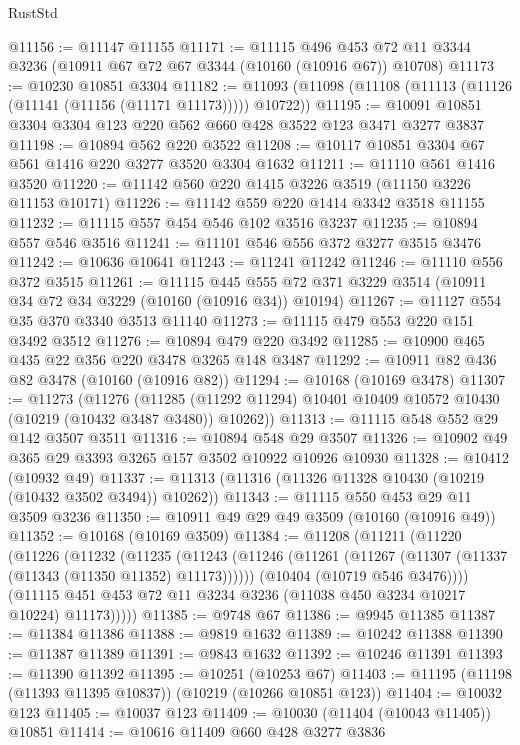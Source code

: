 \begin{lexlean}{RustStd}
\begin{coremodule}
@11156 := @11147 @11155
@11171 := @11115
    @496
    @453
    @72
    @11
    @3344
    @3236
    (@10911 @67 @72 @67 @3344 (@10160 (@10916 @67)) @10708)
@11173 := @10230 @10851 @3304
@11182 := @11093 (@11098 (@11108 (@11113 (@11126 (@11141 (@11156 (@11171 @11173))))) @10722))
@11195 := @10091 @10851 @3304 @3304 @123 @220 @562 @660 @428 @3522 @123 @3471 @3277 @3837
@11198 := @10894 @562 @220 @3522
@11208 := @10117 @10851 @3304 @67 @561 @1416 @220 @3277 @3520 @3304 @1632
@11211 := @11110 @561 @1416 @3520
@11220 := @11142 @560 @220 @1415 @3226 @3519 (@11150 @3226 @11153 @10171)
@11226 := @11142 @559 @220 @1414 @3342 @3518 @11155
@11232 := @11115 @557 @454 @546 @102 @3516 @3237
@11235 := @10894 @557 @546 @3516
@11241 := @11101 @546 @556 @372 @3277 @3515 @3476
@11242 := @10636 @10641
@11243 := @11241 @11242
@11246 := @11110 @556 @372 @3515
@11261 := @11115
    @445
    @555
    @72
    @371
    @3229
    @3514
    (@10911 @34 @72 @34 @3229 (@10160 (@10916 @34)) @10194)
@11267 := @11127 @554 @35 @370 @3340 @3513 @11140
@11273 := @11115 @479 @553 @220 @151 @3492 @3512
@11276 := @10894 @479 @220 @3492
@11285 := @10900 @465 @435 @22 @356 @220 @3478 @3265 @148 @3487
@11292 := @10911 @82 @436 @82 @3478 (@10160 (@10916 @82))
@11294 := @10168 (@10169 @3478)
@11307 := @11273
    (@11276
      (@11285 (@11292 @11294) @10401 @10409 @10572 @10430 (@10219 (@10432 @3487 @3480)) @10262))
@11313 := @11115 @548 @552 @29 @142 @3507 @3511
@11316 := @10894 @548 @29 @3507
@11326 := @10902 @49 @365 @29 @3393 @3265 @157 @3502 @10922 @10926 @10930
@11328 := @10412 (@10932 @49)
@11337 := @11313 (@11316 (@11326 @11328 @10430 (@10219 (@10432 @3502 @3494)) @10262))
@11343 := @11115 @550 @453 @29 @11 @3509 @3236
@11350 := @10911 @49 @29 @49 @3509 (@10160 (@10916 @49))
@11352 := @10168 (@10169 @3509)
@11384 := @11208
    (@11211
      (@11220
        (@11226
          (@11232
            (@11235
              (@11243
                (@11246 (@11261 (@11267 (@11307 (@11337 (@11343 (@11350 @11352) @11173))))))
                (@10404 (@10719 @546 @3476))))
            (@11115 @451 @453 @72 @11 @3234 @3236 (@11038 @450 @3234 @10217 @10224) @11173)))))
@11385 := @9748 @67
@11386 := @9945 @11385
@11387 := @11384 @11386
@11388 := @9819 @1632
@11389 := @10242 @11388
@11390 := @11387 @11389
@11391 := @9843 @1632
@11392 := @10246 @11391
@11393 := @11390 @11392
@11395 := @10251 (@10253 @67)
@11403 := @11195 (@11198 (@11393 @11395 @10837)) (@10219 (@10266 @10851 @123))
@11404 := @10032 @123
@11405 := @10037 @123
@11409 := @10030 (@11404 (@10043 @11405)) @10851
@11414 := @10616 @11409 @660 @428 @3277 @3836

\end{coremodule}
\end{lexlean}
